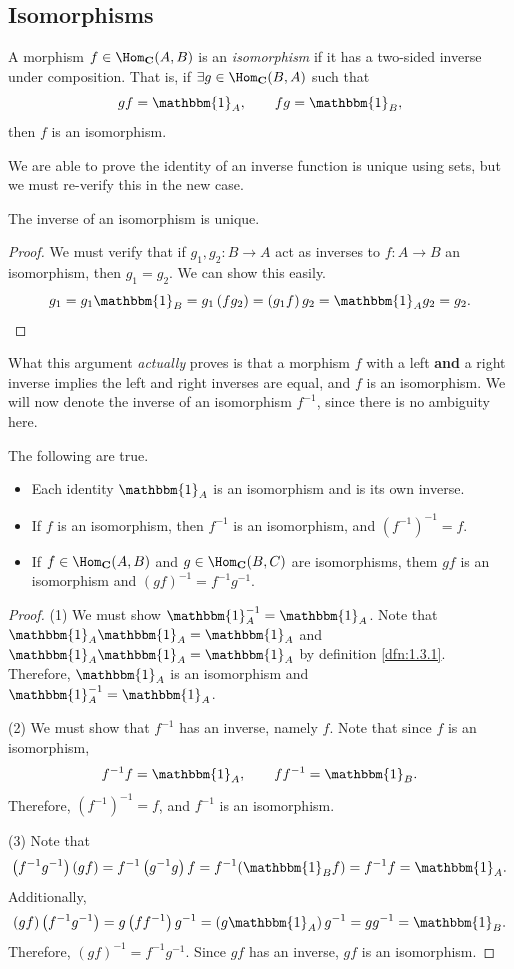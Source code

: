 \subsection{Isomorphisms}
\begin{definition}[Isomorphism]\label{dfn:1.4.1}
	A morphism $f\in \Hom_{\mathbf{C}}(A , B) $ is an \emph{isomorphism} if it has a two-sided inverse under composition. That is, if $\exists g\in \Hom_{\mathbf{C}}(B , A) $ such that
	\[
		gf=\mathbbm{1}_{A} ,\qquad fg=\mathbbm{1}_{B} 
	,\]
	then $f$ is an isomorphism.
\end{definition}
We are able to prove the identity of an inverse function is unique using sets, but we must re-verify this in the new case.
\begin{proposition}\label{prp:1.4.1}
	The inverse of an isomorphism is unique.
\end{proposition}
\begin{proof}
	We must verify that if $g_1,g_2 : B \to A$ act as inverses to $f : A \to B$ an isomorphism, then $g_1=g_2$. We can show this easily.
	\[
		g_1=g_1\mathbbm{1}_{B} =g_1\left( fg_2 \right) =\left( g_1f \right) g_2=\mathbbm{1}_{A} g_2=g_2
	.\]
\end{proof}
What this argument \emph{actually} proves is that a morphism $f$ with a left \textbf{and} a right inverse implies the left and right inverses are equal, and $f$ is an isomorphism. We will now denote the inverse of an isomorphism $f^{-1}$, since there is no ambiguity here.
\begin{proposition}\label{prp:1.4.2}
	The following are true.
	\begin{itemize}
		\item Each identity $\mathbbm{1}_{A} $ is an isomorphism and is its own inverse.
		\item If $f$ is an isomorphism, then $f^{-1}$ is an isomorphism, and $\left( f^{-1} \right) ^{-1}=f$.
		\item If $f\in \Hom_{\mathbf{C}}(A , B) $ and $g\in \Hom_{\mathbf{C}}(B , C) $ are isomorphisms, them $gf$ is an isomorphism and $(gf)^{-1}=f^{-1}g^{-1}$.
	\end{itemize}
\end{proposition}
\begin{proof}
	(1) We must show $\mathbbm{1}_{A} ^{-1}=\mathbbm{1}_{A} $. Note that $\mathbbm{1}_{A} \mathbbm{1}_{A} =\mathbbm{1}_{A} $ and $\mathbbm{1}_{A} \mathbbm{1}_{A} =\mathbbm{1}_{A} $ by definition \ref{dfn:1.3.1}. Therefore, $\mathbbm{1}_{A} $ is an isomorphism and $\mathbbm{1}_{A} ^{-1}=\mathbbm{1}_{A} $.

	(2) We must show that $f^{-1}$ has an inverse, namely $f$. Note that since $f$ is an isomorphism,
	\[
		f^{-1}f=\mathbbm{1}_{A} ,\qquad ff ^{-1}=\mathbbm{1}_{B} 
	.\]
	Therefore, $\left( f^{-1} \right) ^{-1}=f$, and $f^{-1}$ is an isomorphism.

	(3) Note that
	\[
		\left( f^{-1}g^{-1} \right) (gf)=f^{-1}\left( g^{-1}g \right) f=f^{-1}(\mathbbm{1}_{B} f)=f^{-1}f=\mathbbm{1}_{A} 
	.\]
	Additionally,
	\[
		(gf)\left( f^{-1}g^{-1} \right) =g\left( ff^{-1} \right) g^{-1}=\left( g\mathbbm{1}_{A}  \right) g^{-1}=gg^{-1}=\mathbbm{1}_{B} 
	.\]
	Therefore, $(gf)^{-1}=f^{-1}g^{-1}$. Since $gf$ has an inverse, $gf$ is an isomorphism.
\end{proof}
